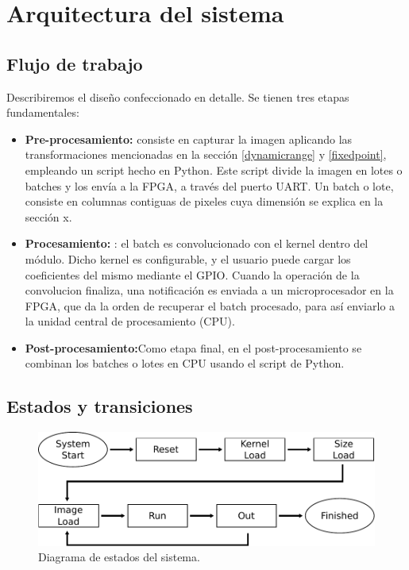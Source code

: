 \chapter{Arquitectura del sistema}  \label{arquitectura_sec}
\section{Flujo de trabajo}  \label{workflow_subsecc}

Describiremos el diseño confeccionado en detalle. Se tienen tres etapas fundamentales:

\begin{itemize}
\item \textbf{Pre-procesamiento:} consiste en capturar la imagen aplicando las
  transformaciones mencionadas en la sección \ref{dynamicrange} y \ref{fixedpoint}, empleando un script hecho en Python. Este script divide la imagen en lotes o batches y los envía a la FPGA, a través del puerto UART. Un batch o lote, consiste en columnas contiguas de pixeles cuya dimensión se explica en la sección x.
\item \textbf{Procesamiento:}	: el batch es convolucionado con el kernel dentro del módulo. Dicho kernel es configurable, y el usuario puede cargar los coeficientes del mismo mediante el GPIO. 
  Cuando la operación de la convolucion finaliza, una notificación es enviada a
  un microprocesador en la FPGA, que da la orden de recuperar el batch procesado, para así enviarlo a la unidad central de procesamiento (CPU).
\item \textbf{Post-procesamiento:}Como etapa final, en el post-procesamiento se combinan los batches o lotes en CPU usando el script de Python.
\end{itemize}

\section{Estados y transiciones}  \label{states_subsecc}

\begin{figure}
\centering
\includegraphics[scale=0.7]{states.pdf}
\caption{Diagrama de estados del sistema.}
\label{statesfig}
\end{figure}

